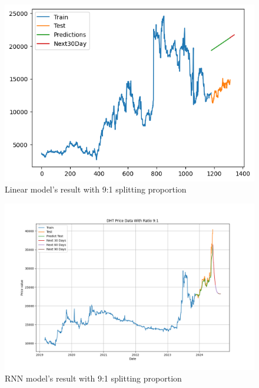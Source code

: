 \documentclass{ieeeojies}
\begin{document}
\vspace{-1em}

\begin{figure}[H]
  \centering
  \begin{minipage}{0.8\linewidth}
    \centering
    \includegraphics[width=\linewidth]{bibliography/Figure/LN_DHT(9_1).png}
    \caption{Linear model's result with 9:1 splitting proportion}
    \label{fig8}
  \end{minipage}
\end{figure}

\vspace{-1em}

\begin{figure}[H]
  \centering
  \begin{minipage}{0.8\linewidth}
    \centering
    \includegraphics[width=\linewidth]{bibliography/Figure/RNN_91_DHT.png}
    \caption{RNN model's result with 9:1 splitting proportion}
    \label{fig8}
  \end{minipage}
\end{figure}
\end{document}
